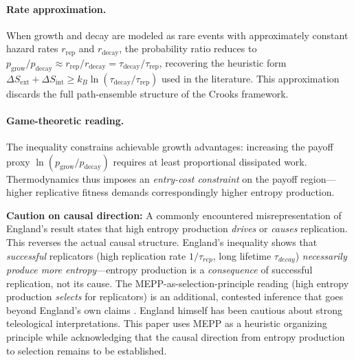 \documentclass[12pt,a4paper]{article}
\theoremstyle{remark}
\begin{document}
\paragraph{Rate approximation.} When growth and decay are modeled as rare events with approximately constant hazard rates $r_{\mathrm{rep}}$ and $r_{\mathrm{decay}}$, the probability ratio reduces to $p_{\mathrm{grow}} / p_{\mathrm{decay}} \approx r_{\mathrm{rep}} / r_{\mathrm{decay}} = \tau_{\mathrm{decay}} / \tau_{\mathrm{rep}}$, recovering the heuristic form $\Delta S_{\mathrm{ext}} + \Delta S_{\mathrm{int}} \geq k_B \ln(\tau_{\mathrm{decay}} / \tau_{\mathrm{rep}})$ used in the literature. This approximation discards the full path-ensemble structure of the Crooks framework.

\paragraph{Game-theoretic reading.} The inequality constrains achievable growth advantages: increasing the payoff proxy $\ln(p_{\mathrm{grow}} / p_{\mathrm{decay}})$ requires at least proportional dissipated work. Thermodynamics thus imposes an \emph{entry-cost constraint} on the payoff region---higher replicative fitness demands correspondingly higher entropy production.

\textbf{Caution on causal direction:} A commonly encountered misrepresentation of England's result states that high entropy production \emph{drives} or \emph{causes} replication. This reverses the actual causal structure. England's inequality shows that \emph{successful} replicators (high replication rate $1/\tau_{rep}$, long lifetime $\tau_{decay}$) \emph{necessarily produce more entropy}---entropy production is a \emph{consequence} of successful replication, not its cause. The MEPP-as-selection-principle reading (high entropy production \emph{selects} for replicators) is an additional, contested inference that goes beyond England's own claims \citep{England2013}. England himself has been cautious about strong teleological interpretations. This paper uses MEPP as a heuristic organizing principle while acknowledging that the causal direction from entropy production to selection remains to be established.
\end{document}
